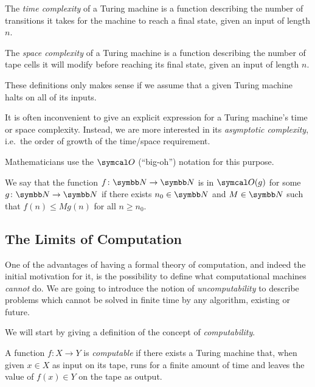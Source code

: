 \begin{definition}
The \emph{time complexity} of a Turing machine is a function describing the number of transitions it takes for the machine to reach a final state, given an input of length \(n\).
\end{definition}

\begin{definition}
The \emph{space complexity} of a Turing machine is a function describing the number of tape cells it will modify before reaching its final state, given an input of length \(n\).
\end{definition}

\begin{remark*}
These definitions only makes sense if we assume that a given Turing machine halts on all of its inputs.
\end{remark*}

It is often inconvenient to give an explicit expression for a Turing machine's time or space complexity. Instead, we are more interested in its \emph{asymptotic complexity}, i.e.\ the order of growth of the time/space requirement.

Mathematicians use the \(\bigO\) (``big-oh'') notation for this purpose.

\begin{definition}
We say that the function \(f \colon \naturals \to \naturals\) is in \(\bigO(g)\) for some \(g \colon \naturals \to \naturals\) if there exists \(n_0 \in \naturals\) and \(M \in \naturals\) such that \(f(n) \leq M g(n)\) for all \(n \geq n_0\).
\end{definition}

\subsection{The Limits of Computation}

One of the advantages of having a formal theory of computation, and indeed the initial motivation for it, is the possibility to define what computational machines \emph{cannot} do. We are going to introduce the notion of \emph{uncomputability} to describe problems which cannot be solved in finite time by any algorithm, existing or future.

We will start by giving a definition of the concept of \emph{computability}.

\begin{definition}
A function \(f \colon X \to Y\) is \emph{computable} if there exists a Turing machine that, when given \(x \in X\) as input on its tape, runs for a finite amount of time and leaves the value of \(f(x) \in Y\) on the tape as output.
\end{definition}

